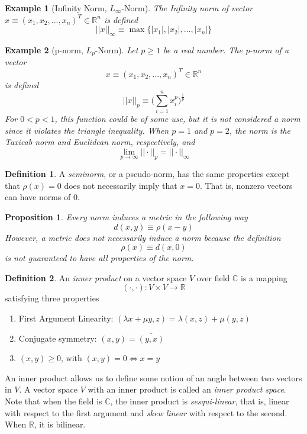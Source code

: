 \documentclass{article}
\newtheorem{proposition}[theorem]{Proposition}
\newtheorem{example}{Example}[section]
\theoremstyle{remark}
\theoremstyle{definition}
\newtheorem{definition}{Definition}[section]
\begin{document}
\begin{example}[Infinity Norm, $L_\infty$-Norm]
The Infinity norm of vector $x \equiv (x_1, x_2, ..., x_n)^T \in \mathbb{R}^n$ is defined
\[ ||x||_\infty \equiv \max{\{|x_1|, |x_2|, ..., |x_n|\}}\]
\end{example}

\begin{example}[p-norm, $L_p$-Norm]
Let $p\geq 1$ be a real number. The p-norm of a vector 
  \[x \equiv (x_1, x_2, ..., x_n)^T \in \mathbb{R}^n\]
is defined
  \[ ||x||_p \equiv \bigg( \sum_{i=1}^n x_i^p \bigg)^{\frac{1}{p}}\]
For $0<p<1$, this function could be of some use, but it is not considered a norm since it violates the triangle inequality. When $p = 1$ and $p =2$, the norm is the Taxicab norm and Euclidean norm, respectively, and 
\[ \lim_{p \rightarrow \infty} ||\cdot||_p = ||\cdot||_\infty\]
\end{example}

\begin{definition}
A \textit{seminorm}, or a pseudo-norm, has the same properties except that $\rho(x) = 0$ does not necessarily imply that $x = 0$. That is, nonzero vectors can have norms of $0$. 
\end{definition}

\begin{proposition}
Every norm induces a metric in the following way
\[ d(x, y) \equiv \rho(x-y)\]
However, a metric does not necessarily induce a norm because the definition
\[\rho(x) \equiv d(x, 0)\]
is not guaranteed to have all properties of the norm. 
\end{proposition}

\begin{definition}
An \textit{inner product} on a vector space $V$ over field $\mathbb{C}$ is a mapping 
\[(\cdot, \cdot): V \times V \longrightarrow \mathbb{R}\]
satisfying three properties 
\begin{enumerate}
    \item First Argument Linearity: $(\lambda x + \mu y, z) = \lambda (x, z) + \mu (y, z)$
    \item Conjugate symmetry: $(x, y) = \bar{(y, x)}$
    \item $(x, y) \geq 0$, with $(x, y) = 0 \iff x = y$
\end{enumerate}
An inner product allows us to define some notion of an angle between two vectors in $V$. A vector space $V$ with an inner product is called an \textit{inner product space}. Note that when the field is $\mathbb{C}$, the inner product is \textit{sesqui-linear}, that is, linear with respect to the first argument and \textit{skew linear} with respect to the second. When $\mathbb{R}$, it is bilinear. 
\end{definition}
\end{document}
